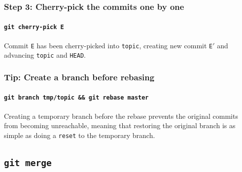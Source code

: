 \documentclass{beamer}
\newcommand\gitcmd[1]{\texttt{git #1}}
\newcommand\gitsubcmd[1]{\texttt{#1}}
\newcommand\grefspec[1]{\texttt{#1}}
\newcommand\gbranch[1]{\texttt{#1}}
\newcommand\gHEAD{\texttt{HEAD}}
\begin{document}
\begin{frame}
  \frametitle{Step 3: Cherry-pick the commits one by one}
  \framesubtitle{\gitcmd{cherry-pick E}}

  \begin{figure}
    \centering
  \end{figure}

  Commit \grefspec{E} has been cherry-picked into \gbranch{topic}, creating new commit \grefspec{E$'$} and advancing \gbranch{topic} and \gHEAD{}.
\end{frame}

\begin{frame}
  \frametitle{Tip: Create a branch before rebasing}
  \framesubtitle{\texttt{\gitcmd{branch tmp/topic} \&\& \gitcmd{rebase master}}}

  \begin{figure}
    \centering
  \end{figure}

  Creating a temporary branch before the rebase prevents the original commits from becoming unreachable, meaning that restoring the original branch is as simple as doing a \gitsubcmd{reset} to the temporary branch.
\end{frame}

\subsection{\gitcmd{merge}}
\end{document}
